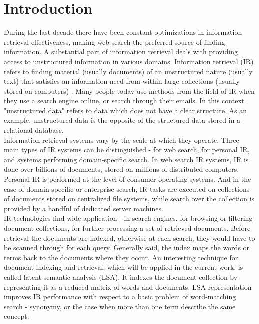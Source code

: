 \chapter{Introduction}
\label{sec:introduction}

During the last decade there have been constant optimizations in information retrieval effectiveness, making web search the preferred source of finding information. A substantial part of information retrieval deals with providing access to unstructured information in various domains. Information retrieval (IR) refers to finding material (usually documents) of an unstructured nature (usually text) that satisfies an information need from within large collections (usually stored on computers) \cite{Mann08}. Many people today use methods from the field of IR when they use a search engine online, or search through their emails. In this context "unstructured data" refers to data which does not have a clear structure. As an example, unstructured data is the opposite of the structured data stored in a relational database.    \\

Information retrieval systems vary by the scale at which they operate. Three main types of IR systems can be distinguished - for web search, for personal IR, and systems performing domain-specific search. In web search IR systems, IR is done over billions of documents, stored on millions of distributed computers. Personal IR is performed at the level of consumer operating systems. And in the case of domain-specific or enterprise search, IR tasks are executed on collections of documents stored on centralized file systems, while search over the collection is provided by a handful of dedicated server machines. \\

IR technologies find wide application - in search engines, for browsing or filtering document collections, for further processing a set of retrieved documents. Before retrieval the documents are indexed, otherwise at each search, they would have to be scanned through for each query. Generally said, the index maps the words or terms back to the documents where they occur. An interesting technique for document indexing and retrieval, which will be applied in the current work, is called latent semantic analysis (LSA). It indexes the document collection by representing it as a reduced matrix of words and documents. LSA representation improves IR performance with respect to a basic problem of word-matching search - synonymy, or the case when more than one term describe the same concept. \\

